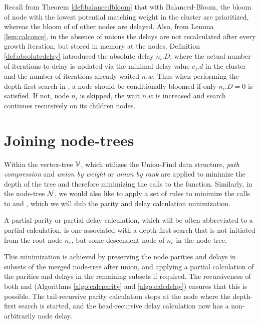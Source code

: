 Recall from Theorem \ref{def:balancedbloom} that with Balanced-Bloom, the bloom of node with the lowest potential matching weight in the cluster are prioritized, whereas the bloom of of other nodes are delayed. Also, from Lemma \ref{lem:calconce}, in the absence of unions the delays are not recalculated after every growth iteration, but stored in memory at the nodes. Definition \ref{def:absolutedelay} introduced the absolute delay $n_i.D$, where the actual number of iterations to delay is updated via the minimal delay value $c_j.d$ in the cluster and the number of iterations already waited $n.w$. Thus when performing the depth-first search in , a node should be conditionally bloomed if only $n_i.D = 0$ is satisfied. If not, node $n_i$ is skipped, the wait $n.w$ is increased and search continues recursively on its children nodes. 




\section{Joining node-trees}\label{sec:nodejoin}
Within the vertex-tree $\mathcal{V}$, which utilizes the Union-Find data structure, \emph{path compression} and \emph{union by weight} or \emph{union by rank} are applied to minimize the depth of the tree and therefore minimizing the calls to the  function. Similarly, in the node-tree $\mathcal{N}$, we would also like to apply a set of rules to minimize the calls to  and , which we will dub the parity and delay calculation minimization.

\begin{definition}\label{def:partialpdc}
  A partial parity or partial delay calculation, which will be often abbreviated to a partial calculation, is one associated with a depth-first search that is not initiated from the root node $n_r$, but some descendent node of $n_r$ in the node-tree. 
\end{definition}

This minimization is achieved by preserving the node parities and delays in subsets of the merged node-tree after union, and applying a partial calculation of the parities and delays in the remaining subsets if required. The recursiveness of both  and  (Algorithms \ref{algo:calcparity} and \ref{algo:calcdelay}) ensures that this is possible. The tail-recursive parity calculation stops at the node where the depth-first search is started, and the head-recursive delay calculation now has a non-arbitrarily node delay. 

